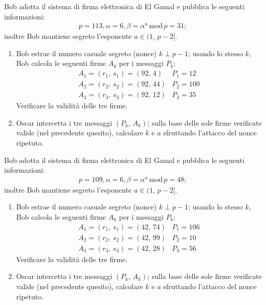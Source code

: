         Bob adotta il sistema di firma elettronica di El Gamal e pubblica le seguenti informazioni:
        \begin{gather*}
            p=113, \alpha = 6, \beta = \alpha^a\,\mathrm{mod}\,p=31
        ;\end{gather*}
        inoltre Bob mantiene segreto l'esponente $a\in (1,\,p-2]$.
        \begin{enumerate}
            \item Bob estrae il numero casuale segreto (nonce) $k\perp p-1$; usando lo stesso $k$, 
                Bob calcola le seguenti firme $A_k$ per i messaggi $P_k$:
                \[\begin{array}{ll}
                    A_1=(r_1,\,s_1)=(92,\,4) & P_1=12\\
                    A_2=(r_2,\,s_2)=(92,\,44) & P_2=100\\
                    A_3=(r_3,\,s_3)=(92,\,12) & P_3=35
                \end{array}\]
                Verificare la validità delle tre firme.
            \item Oscar intercetta i tre messaggi $(P_k,\,A_k)$; sulla base delle sole firme verificate valide 
                (nel precedente quesito), calcolare $k$ e $a$ sfruttando l'attacco del nonce ripetuto.
        \end{enumerate}

        Bob adotta il sistema di firma elettronica di El Gamal e pubblica le seguenti informazioni:
        \begin{gather*}
            p=109, \alpha = 6, \beta = \alpha^a\,\mathrm{mod}\,p=48
        ;\end{gather*}
        inoltre Bob mantiene segreto l'esponente $a\in (1,\,p-2]$.
        \begin{enumerate}
            \item Bob estrae il numero casuale segreto (nonce) $k\perp p-1$; usando lo stesso $k$, 
                Bob calcola le seguenti firme $A_k$ per i messaggi $P_k$:
                \[\begin{array}{ll}
                    A_1=(r_1,\,s_1)=(42,\,74) & P_1=106\\
                    A_2=(r_2,\,s_2)=(42,\,99) & P_2=10\\
                    A_3=(r_3,\,s_3)=(42,\,28) & P_3=56
                \end{array}\]
                Verificare la validità delle tre firme.
            \item Oscar intercetta i tre messaggi $(P_k,\,A_k)$; sulla base delle sole firme verificate valide 
                (nel precedente quesito), calcolare $k$ e $a$ sfruttando l'attacco del nonce ripetuto.
        \end{enumerate}

